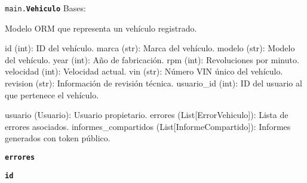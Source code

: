 \documentclass[a4paper,11pt,spanish]{sphinxmanual}
\newcommand{\robotoMonoBold}{\fontseries{b}\selectfont\ttfamily}
\renewcommand{\sphinxcode}[1]{\textcolor{sphinxorangeCode}{{\robotoMonoBold #1}}}
\renewcommand{\sphinxbfcode}[1]{\textbf{\sphinxcode{#1}}}
\renewcommand{\sphinxupquote}[1]{\texttt{#1}}
\begin{document}

\begin{fulllineitems}
\label{\detokenize{modelos:main.Vehiculo}}
\pysigstartsignatures
\pysiglinewithargsret
{\sphinxbfcode{\sphinxupquote{}}\sphinxcode{\sphinxupquote{main.}}\sphinxbfcode{\sphinxupquote{Vehiculo}}}
{}
{}
\pysigstopsignatures
\sphinxAtStartPar
Bases: {\hyperref[\detokenize{modelos:main.Base}]{\sphinxcrossref{\sphinxcode{\sphinxupquote{Base}}}}}

\sphinxAtStartPar
Modelo ORM que representa un vehículo registrado.
\begin{description}
\sphinxAtStartPar
id (int): ID del vehículo.
marca (str): Marca del vehículo.
modelo (str): Modelo del vehículo.
year (int): Año de fabricación.
rpm (int): Revoluciones por minuto.
velocidad (int): Velocidad actual.
vin (str): Número VIN único del vehículo.
revision (str): Información de revisión técnica.
usuario\_id (int): ID del usuario al que pertenece el vehículo.

\sphinxAtStartPar
usuario (Usuario): Usuario propietario.
errores (List{[}ErrorVehiculo{]}): Lista de errores asociados.
informes\_compartidos (List{[}InformeCompartido{]}): Informes generados con token público.

\end{description}

\begin{fulllineitems}
\label{\detokenize{modelos:main.Vehiculo.errores}}
\pysigstartsignatures
\pysigline
{\sphinxbfcode{\sphinxupquote{errores}}}
\pysigstopsignatures
\end{fulllineitems}


\begin{fulllineitems}
\label{\detokenize{modelos:main.Vehiculo.id}}
\pysigstartsignatures
\pysigline
{\sphinxbfcode{\sphinxupquote{id}}}
\pysigstopsignatures
\end{fulllineitems}



\end{fulllineitems}
\end{document}
